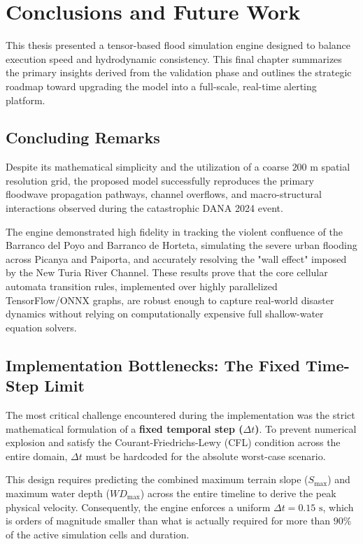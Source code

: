 \chapter{Conclusions and Future Work}
\label{chapter:conclusions_and_future_work}


This thesis presented a tensor-based flood simulation engine designed to balance execution speed and hydrodynamic consistency. This final 
chapter summarizes the primary insights derived from the validation phase and outlines the strategic roadmap toward upgrading the model 
into a full-scale, real-time alerting platform.


\section{Concluding Remarks}
\label{section:concluding_remarks}

Despite its mathematical simplicity and the utilization of a coarse $200\text{ m}$ spatial resolution grid, the proposed model successfully 
reproduces the primary floodwave propagation pathways, channel overflows, and macro-structural interactions observed during the catastrophic 
DANA 2024 event. 

The engine demonstrated high fidelity in tracking the violent confluence of the Barranco del Poyo and Barranco de Horteta, simulating the 
severe urban flooding across Picanya and Paiporta, and accurately resolving the "wall effect" imposed by the New Turia River Channel. These 
results prove that the core cellular automata transition rules, implemented over highly parallelized TensorFlow/ONNX graphs, are robust 
enough to capture real-world disaster dynamics without relying on computationally expensive full shallow-water equation solvers.

\section{Implementation Bottlenecks: The Fixed Time-Step Limit}
\label{section:implementation_bottlenecks}

The most critical challenge encountered during the implementation was the strict mathematical formulation of a \textbf{fixed temporal step 
($\Delta t$)}. To prevent numerical explosion and satisfy the Courant-Friedrichs-Lewy (CFL) condition across the entire domain, $\Delta t$ 
must be hardcoded for the absolute worst-case scenario. 

This design requires predicting the combined maximum terrain slope ($S_{\text{max}}$) and maximum water depth ($WD_{\text{max}}$) across the 
entire timeline to derive the peak physical velocity. Consequently, the engine enforces a uniform $\Delta t = 0.15\text{ s}$, which is 
orders of magnitude smaller than what is actually required for more than $90\%$ of the active simulation cells and duration. 

